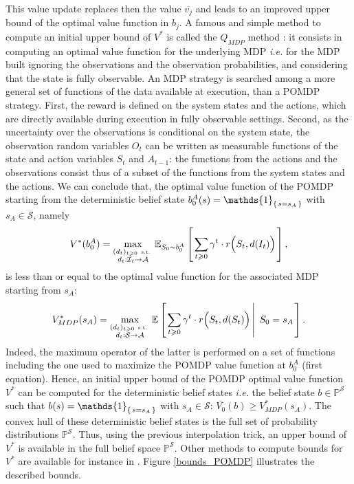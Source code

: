 This value update replaces then the value $\overline{v_j}$
and leads to an improved upper bound of the optimal value function in $b_j$.
A famous and simple method to compute an initial upper bound of $V^*$ 
is called the $Q_{MDP}$ method \cite{Littman96algorithmsfor}: 
it consists in computing an optimal value function
for the underlying MDP \textit{i.e.} for the MDP built 
ignoring the observations and the observation probabilities, 
and considering that the state is fully observable.
An MDP strategy is searched among a more general set of functions 
of the data available at execution, 
than a POMDP strategy. 
First, the reward is defined on the system states and the actions,
which are directly available during execution in fully observable settings. 
Second, as the uncertainty over the observations is conditional on the system state,
the observation random variables $O_t$ can be written as measurable functions of the state and action variables $S_t$ and $A_{t-1}$:
the functions from the actions and the observations consist thus of a subset of the functions from the system states and the actions.
We can conclude that, the optimal value function of the POMDP starting from the deterministic belief state $b^A_0(s) = \mathds{1}_{ \set{s=s_A}}$ with $s_A \in \mathcal{S}$,
namely 
\[ V^*(b^A_0) = \max_{  \substack{ (d_t)_{t \geqslant 0} \mbox{ \tiny s.t. } \\ d_t: \mathcal{I}_t \rightarrow \mathcal{A}  }} \mathbb{E}_{S_0 \sim b^A_0} \left[ \left.  \sum_{t \geqslant 0} \gamma^t \cdot r\Big(S_t,d(I_t)\Big)  \right. \right], \]
is less than or equal to the optimal value function for the associated MDP starting from $s_A$: 
\[ V_{MDP}^*(s_A) = \max_{  \substack{ (d_t)_{t \geqslant 0} \mbox{ \tiny s.t. } \\ d_t: \mathcal{S} \rightarrow \mathcal{A} } } \mathbb{E} \left[ \left.  \sum_{t \geqslant 0} \gamma^t \cdot r\Big(S_t,d(S_t)\Big) \, \right| \left. \, S_0 = s_A   \right. \right]. \]
Indeed, the maximum operator of the latter 
is performed on a set of functions including 
the one used to maximize the POMDP value function at $b^A_0$ (first equation).
Hence, an initial upper bound of the POMDP optimal value function $V^*$ can be computed for the deterministic belief states \textit{i.e.} 
the belief state $b \in \mathbb{P}^{\mathcal{S}}$ such that $b(s) = \mathds{1}_{\set{ s=s_A }}$ with $s_A \in \mathcal{S}$:
$\overline{V_0}(b) \geqslant V_{MDP}^*(s_A)$. 
The convex hull of these deterministic belief states is the full set of probability distributions $\mathbb{P}^{\mathcal{S}}$.
Thus, using the previous interpolation trick, an upper bound of $V^*$ is available in the full belief space $\mathbb{P}^{\mathcal{S}}$. 
Other methods to compute bounds for $V^*$ are available for instance in \cite{conf/aaai/Hauskrecht97}.
Figure \ref{bounds_POMDP} illustrates the described bounds.

